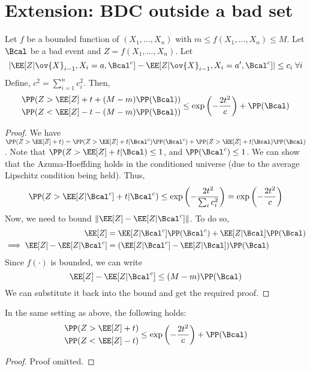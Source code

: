 \section{Extension: BDC outside a bad set}
\begin{theorem}
Let $f$ be a bounded function of $(X_1, \dots, X_n)$ with $m \leq f(X_1, \dots, X_n) \leq M$. Let $\Bcal$ be a bad event and $Z = f(X_1, \dots, X_n)$. Let 
\[
|\EE[Z|\ov{X}_{i-1}, X_i=a, \Bcal^c] - \EE[Z|\ov{X}_{i-1}, X_i=a', \Bcal^c]| \leq c_i \; \forall i
\]
Define, $c^2 = \sum_{i=1}^n c_i^2$. Then,
\begin{equation}
    \begin{split}
        &\PP(Z > \EE[Z] + t + (M-m)\PP(\Bcal)) \\
        &\PP(Z < \EE[Z] - t - (M-m)\PP(\Bcal))
    \end{split}
    \leq \exp\left(-\frac{2t^2}{c}\right) + \PP(\Bcal)
\end{equation}
\end{theorem}
\begin{proof}
We have $\PP(Z > \EE[Z] + t) = \PP(Z > \EE[Z] + t | \Bcal^c)\PP(\Bcal^c) + \PP(Z > \EE[Z] + t | \Bcal)\PP(\Bcal)$. Note that $\PP(Z > \EE[Z] + t | \Bcal) \leq 1$, and $\PP(\Bcal^c) \leq 1$. We can show that the Azuma-Hoeffding holds in the conditioned universe (due to the average Lipschitz condition being held). Thus,
\[
\PP(Z  > \EE[Z|\Bcal^c] + t | \Bcal^c) \leq \exp\left(-\frac{2t^2}{\sum_i c_i^2}\right) = \exp\left(-\frac{2t^2}{c}\right)
\]
Now, we need to bound $\|\EE[Z] - \EE[Z|\Bcal^c]\|$. To do so,
\begin{align*}
    \EE[Z] &= \EE[Z|\Bcal^c] \PP(\Bcal^c) + \EE[Z | \Bcal] \PP(\Bcal) \\
\implies \EE[Z] - \EE[Z|\Bcal^c] &= (\EE[Z|\Bcal^c] - \EE[Z|\Bcal])\PP(\Bcal)
\end{align*}
Since $f(\cdot)$ is bounded, we can write
\[
\EE[Z] - \EE[Z|\Bcal^c] \leq (M-m)\PP(\Bcal)
\]
We can substitute it back into the bound and get the required proof.
\end{proof}
\begin{theorem}
In the same setting as above, the following holds:
\begin{equation}
    \begin{split}
        &\PP(Z > \EE[Z] + t) \\
        &\PP(Z < \EE[Z] - t)
    \end{split}
    \leq \exp\left(-\frac{2t^2}{c}\right) + \PP(\Bcal)
\end{equation}
\end{theorem}
\begin{proof}
Proof omitted.
\end{proof}
